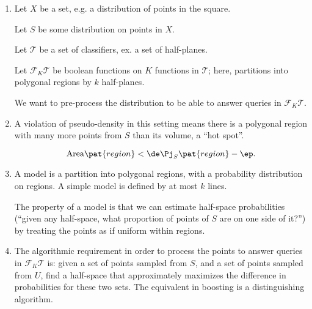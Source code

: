 \begin{enumerate}
\item
Let $X$ be a set, e.g. a distribution of points in the square. %

Let $S$ be some distribution on points in $X$.


Let $\mathcal T$ be a set of classifiers, ex. a set of half-planes.

Let $\mathcal F_K\mathcal T$ be boolean functions on $K$ functions in $\mathcal T$; here, partitions into polygonal regions by $k$ half-planes.

We want to pre-process the distribution to be able to answer queries in $\mathcal F_K\mathcal T$.
\item
A violation of pseudo-density in this setting means there is a polygonal region with many more points from $S$ than its volume, a ``hot spot''.



$$
\text{Area}\pat{region}< \de \Pj_S\pat{region}-\ep.
$$
\item
A model is a partition into polygonal regions, with a probability distribution on regions. A simple model is defined by at most $k$ lines. 

The property of a model is that we can estimate half-space probabilities (``given any half-space, what proportion of points of $S$ are on one side of it?'') by treating the points as if uniform within regions.


\item
The algorithmic requirement in order to process the points to answer queries in $\mathcal F_K\mathcal T$ is:  given a set of points sampled from $S$, and a set of points sampled from $U$, find a half-space that approximately maximizes the difference in probabilities for these two sets. The equivalent in boosting is a distinguishing algorithm.
\end{enumerate}

